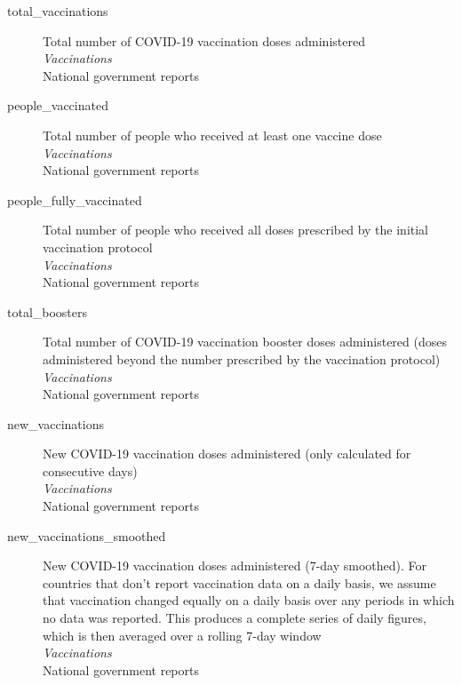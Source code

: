 \begin{description}
    \item[total\_vaccinations] 
    Total number of COVID-19 vaccination doses administered\\
    \emph{\footnotesize{Vaccinations}}\\
    \footnotesize{National government reports}\\

    \item[people\_vaccinated] 
    Total number of people who received at least one vaccine dose\\
    \emph{\footnotesize{Vaccinations}}\\
    \footnotesize{National government reports}\\

    \item[people\_fully\_vaccinated] 
    Total number of people who received all doses prescribed by the initial vaccination protocol\\
    \emph{\footnotesize{Vaccinations}}\\
    \footnotesize{National government reports}\\

    \item[total\_boosters] 
    Total number of COVID-19 vaccination booster doses administered (doses administered beyond the number prescribed by the vaccination protocol)\\
    \emph{\footnotesize{Vaccinations}}\\
    \footnotesize{National government reports}\\

    \item[new\_vaccinations] 
    New COVID-19 vaccination doses administered (only calculated for consecutive days)\\
    \emph{\footnotesize{Vaccinations}}\\
    \footnotesize{National government reports}\\

    \item[new\_vaccinations\_smoothed] 
    New COVID-19 vaccination doses administered (7-day smoothed). For countries that don't report vaccination data on a daily basis, we assume that vaccination changed equally on a daily basis over any periods in which no data was reported. This produces a complete series of daily figures, which is then averaged over a rolling 7-day window\\
    \emph{\footnotesize{Vaccinations}}\\
    \footnotesize{National government reports}\\


\end{description}
